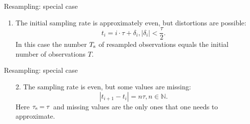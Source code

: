 \documentclass{beamer}
\begin{document}
\begin{frame}{Resampling: special case}

\begin{enumerate}
\item The initial sampling rate is approximately even, but distortions are possible:
\[ t_i = i\cdot\tau + \delta_i, |\delta_i| < \frac{\tau}{2}.\]
In this case the number $T_{\text{s}}$ of resampled observations equals the initial number of observations $T$.
\end{enumerate}



\end{frame}
\begin{frame}{Resampling: special case}

\begin{enumerate}
\item[2.] The sampling rate is even, but some values are missing:
\[ |t_{i+1} - t_{i}| = n\tau, n \in \mathbb{N}.\]
Here $\tau_{\text{s}} = \tau$ and missing values are the only ones that one needs to approximate.
\end{enumerate}



\end{frame}
\end{document}
